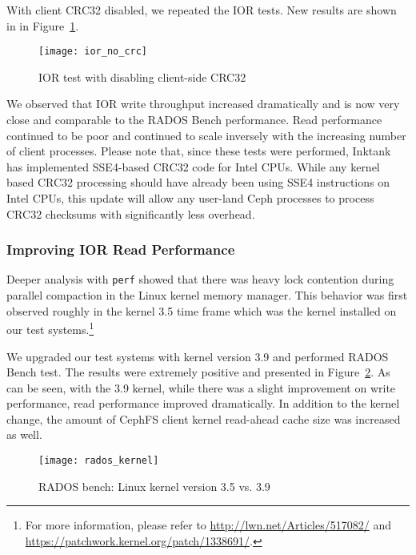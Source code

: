 With client CRC32 disabled, we repeated the IOR tests. New results are shown in
in Figure~\ref{fig:ior-no-client-crc32}. 

\begin{figure}[htb]
\centering
\texttt{[image: ior\_no\_crc]}
\caption{IOR test with disabling client-side CRC32}
\label{fig:ior-no-client-crc32}
\end{figure}

We observed that IOR write throughput increased dramatically and is now very
close and comparable to the RADOS Bench performance. Read performance continued
to be poor and continued to scale inversely with the increasing number of
client processes.  Please note that, since these tests were performed, Inktank
has implemented SSE4-based CRC32 code for Intel CPUs.  While any kernel based
CRC32 processing should have already been using SSE4 instructions on Intel
CPUs, this update will allow any user-land Ceph processes to process CRC32
checksums with significantly less overhead.

\subsubsection{Improving IOR Read Performance}

Deeper analysis with \verb!perf! showed that there was heavy lock contention during
parallel compaction in the Linux kernel memory manager.  This behavior was first
observed roughly in the kernel 3.5 time frame which was the kernel
installed on our test systems.\footnote{For more information,
please refer to \url{http://lwn.net/Articles/517082/} and
\url{https://patchwork.kernel.org/patch/1338691/}.}

We upgraded our test systems with kernel version 3.9 and performed RADOS Bench
test.  The results were extremely positive and presented in
Figure~\ref{fig:rados-kernel}. As can be seen, with the 3.9 kernel, while
there was a slight improvement on write performance, read performance improved
dramatically.  In addition to the kernel change, the amount of CephFS client
kernel read-ahead cache size was increased as well.


\begin{figure}[htb]
\centering
\texttt{[image: rados\_kernel]}
\caption{RADOS bench: Linux kernel version 3.5 vs. 3.9}
\label{fig:rados-kernel}
\end{figure}



